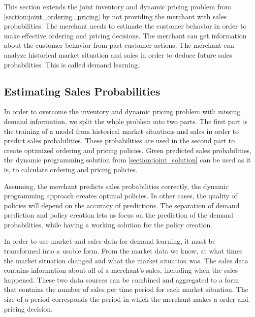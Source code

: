 This section extends the joint inventory and dynamic pricing problem from \cref{section:joint_ordering_pricing} by not providing the merchant with sales probabilities.
The merchant needs to estimate the customer behavior in order to make effective ordering and pricing decisions.
The merchant can get information about the customer behavior from past customer actions.
The merchant can analyze historical market situation and sales in order to deduce future sales probabilities.
This is called demand learning.



\subsection{Estimating Sales Probabilities}
In order to overcome the inventory and dynamic pricing problem with missing demand information, we split the whole problem into two parts.
The first part is the training of a model from historical market situations and sales in order to predict sales probabilities.
These probabilities are used in the second part to create optimized ordering and pricing policies.
Given predicted sales probabilities, the dynamic programming solution from \cref{section:joint_solution} can be used as it is, to calculate ordering and pricing policies.

Assuming, the merchant predicts sales probabilities correctly, the dynamic programming approach creates optimal policies.
In other cases, the quality of policies will depend on the accuracy of predictions. 
The separation of demand prediction and policy creation lets us focus on the prediction of the demand probabilities, while having a working solution for the policy creation.

In order to use market and sales data for demand learning, it must be transformed into a usable form.
From the market data we know, at what times the market situation changed and what the market situation was.
The sales data contains information about all of a merchant's sales, including when the sales happened.
These two data sources can be combined and aggregated to a form that contains the number of sales per time period for each market situation.
The size of a period corresponds the period in which the merchant makes a order and pricing decision.

